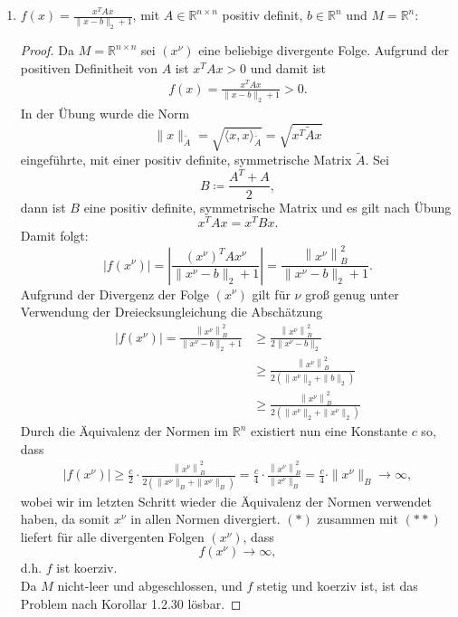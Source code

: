 \documentclass[12pt]{extreport} %
\newcommand{\R}{\mathbb{R}}
\theoremstyle{named}
\theoremstyle{nnamed}
\theoremstyle{itshape}
\theoremstyle{normal}
\begin{document}
\begin{enumerate}
\begin{proof}
			Es gilt $f(x) = (3 x_1 - x_2^2)^2 \geq 0 = \inf_{x \in M} f(x)$, wobei 
			$$ f(x) = 0 \iff (3 x_1 - x_2^2)^2 = 0 \iff x_1 = \frac{x_2^2}{3} $$
			Da es $(x_1, x_2) \in M$ gibt, die die obige Bedingung erfüllen (z.B. $x = \left(\frac{1}{3}, 1\right)$), nimmt $f$ auf $M$ sein Infimum an, und das Problem ist nach Definition 1.2.3. lösbar.
			\end{proof}
		\item $f(x) = \frac{x^T A x}{\| x - b\|_2 + 1}$, mit $A \in \R^{n \times n}$ positiv definit, $b \in \R^n$ und $M = \R^n$:
					\begin{proof}
			Da $M = \R^{n \times n}$ sei $(x^\nu)$ eine beliebige divergente Folge. Aufgrund der positiven Definitheit von $A$ ist $ x^T A x > 0$ und damit ist
			\begin{align}
				f(x) = \frac{x^T A x}{\| x - b\|_2 + 1} > 0. \tag*{$(*)$}
			\end{align}
			In der Übung wurde die Norm
			$$ \| x \|_{\tilde{A}} = \sqrt{\langle x, x \rangle_{\tilde{A}}} = \sqrt{x^T \tilde{A} x} $$
			eingeführte, mit einer positiv definite, symmetrische Matrix $\tilde{A}$. Sei
			$$B \coloneqq \frac{A^T + A}{2},$$
			dann ist $B$ eine positiv definite, symmetrische Matrix und es gilt nach Übung
			$$ x^T A x = x^T B x. $$
			Damit folgt:
			$$ \left| f(x^\nu) \right| =  \left| \frac{\left(x^\nu \right)^T A x^\nu }{\| x^\nu - b\|_2 + 1} \right| = \frac{\left\| x^\nu \right\|_{B}^2}{\| x^\nu - b\|_2 + 1}. $$
			Aufgrund der Divergenz der Folge $(x^\nu)$ gilt für $\nu$ groß genug unter Verwendung der Dreiecksungleichung die Abschätzung
			\begin{align*}
				 \left| f(x^\nu) \right| =  \frac{\left\| x^\nu \right\|_{B}^2}{\| x^\nu - b\|_2 + 1} & \geq \frac{\left\| x^\nu \right\|_{B}^2}{2 \| x^\nu - b\|_2 } \\
				 	& \geq \frac{\left\| x^\nu \right\|_{B}^2}{2 \left( \| x^\nu \|_2 + \| b\|_2 \right)}   \\
				 	& \geq \frac{\left\| x^\nu \right\|_{B}^2}{2 \left( \| x^\nu \|_2 + \| x^\nu \|_2 \right)}  
			\end{align*}
			Durch die Äquivalenz der Normen im $\R^n$ existiert nun eine Konstante $c$ so, dass
			\begin{align}
				\left| f(x^\nu) \right|  \geq \frac{c}{2} \cdot \frac{\left\| x^\nu \right\|_{B}^2}{2 \left( \| x^\nu \|_B + \| x^\nu \|_B \right)} = \frac{c}{4} \cdot \frac{\left\| x^\nu \right\|_{B}^2}{ \| x^\nu \|_B} = \frac{c}{4} \cdot \| x^\nu \|_B \longrightarrow \infty, \tag*{$(**)$}
			\end{align}		
			wobei wir im letzten Schritt wieder die Äquivalenz der Normen verwendet haben, da somit $x^\nu$ in allen Normen divergiert. $(*)$ zusammen mit $(**)$ liefert für alle divergenten Folgen $(x^\nu)$, dass 
			$$  f(x^\nu) \longrightarrow \infty, $$
			d.h. $f$ ist koerziv. ~\\
			
			Da $M$ nicht-leer und abgeschlossen, und $f$ stetig und koerziv ist, ist das Problem nach Korollar 1.2.30 lösbar.
		\end{proof}
	\end{enumerate}
\end{document}
